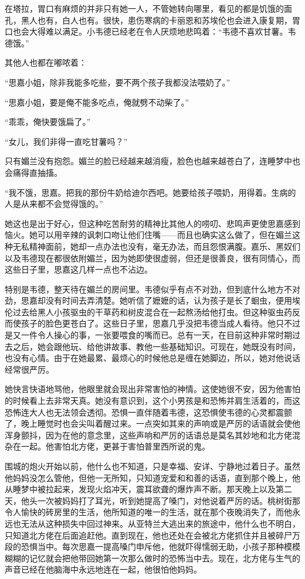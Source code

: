 \par 在塔拉，胃口有麻烦的并非只有她一人，不管她转向哪里，看见的都是饥饿的面孔，黑人也有，白人也有。很快，患伤寒病的卡丽恩和苏埃伦也会进入康复期，胃口也会大得难以满足。小韦德已经老在令人厌烦地悲鸣着：“韦德不喜欢甘薯。韦德饿。”
\par 其他人也都在嘟哝着：
\par “思嘉小姐，除非我能多吃些，要不两个孩子我都没法喂奶了。”
\par “思嘉小姐，要是俺不能多吃点，俺就劈不动柴了。”
\par “乖乖，俺快要饿扁了。”
\par “女儿，我们非得一直吃甘薯吗？”
\par 只有媚兰没有抱怨。媚兰的脸已经越来越消瘦，脸色也越来越苍白了，连睡梦中也会痛得直抽搐。
\par “我不饿，思嘉。把我的那份牛奶给迪尔西吧。她要给孩子喂奶，用得着。生病的人是从来都不会觉得饿的。”
\par 她这也是出于好心，但这种吃苦耐劳的精神比其他人的唠叨、悲鸣声更使思嘉感到恼火。她可以用辛辣的讽刺口吻让他们住嘴——而且也确实这么做了，但在媚兰这种无私精神面前，她却一点办法也没有，毫无办法，而且怨恨满腹。嘉乐、黑奴们以及韦德现在都很依附媚兰，因为她即使很虚弱，但还是很善良，很有同情心，而这些日子里，思嘉这几样一点也不沾边。
\par 特别是韦德，整天待在媚兰的房间里。韦德似乎有点不对劲，但到底什么地方不对劲，思嘉却没有时间去弄清楚。她听信了嬷嬷的话，认为孩子是长了蛔虫，便用埃伦过去给黑人小孩驱虫的干草药和树皮混合在一起熬汤给他打虫。但这种驱虫药反而使孩子的脸色更苍白了。这些日子里，思嘉几乎没把韦德当成人看待。他只不过是又一件令人操心的事，一张要喂食的嘴而已。总有一天，在目前这种非常时期过去之后，她会跟他玩、给他讲故事、教他一些基础知识。可现在，她既没有时间，也没有心情。由于在她最累、最烦心的时候他总是缠在她脚边，所以，她对他说话经常很严厉。
\par 她快言快语地骂他，他眼里就会现出非常害怕的神情。这使她很不安，因为他害怕的时候看上去非常天真。她没有意识到，这个小男孩是和恐怖并肩生活着的，而这恐怖连大人也无法领会透彻。恐惧一直伴随着韦德，这恐惧使韦德的心灵都震颤了，晚上睡觉时也会尖叫着醒过来。一点突如其来的声响或是严厉的话语就会使他浑身颤抖，因为在他的意念里，这些声响和严厉的话语总是莫名其妙地和北方佬混杂在一起。他害怕北方佬，更甚于害怕普里西所说的鬼。
\par 围城的炮火开始以前，他什么也不知道，只是幸福、安详、宁静地过着日子。虽然他妈妈没怎么管他，但他一无所知，只知道宠爱和和善的话语，直到那个晚上，他从睡梦中被拉起来，发现火焰冲天，震耳欲聋的爆炸声不断。那天晚上以及第二天，他头一次被妈妈打了耳光，听到她提高了嗓门，对他说着严厉的话。桃树街那令人愉快的砖房里的生活，他所知道的唯一的生活，就在那个夜晚消失了，而他永远也无法从这种损失中回过神来。从亚特兰大逃出来的旅途中，他什么也不明白，只知道北方佬在后面追赶他。直到现在，他也还处在会被北方佬抓住并且被碎尸万段的恐惧当中。每次思嘉一提高嗓门申斥他，他就吓得懦弱无助，小孩子那种模模糊糊的记忆就会把他带回她第一次那么做时的恐怖当中去。现在，北方佬与生气的声音已经在他脑海中永远地连在一起，他很怕他妈妈。
